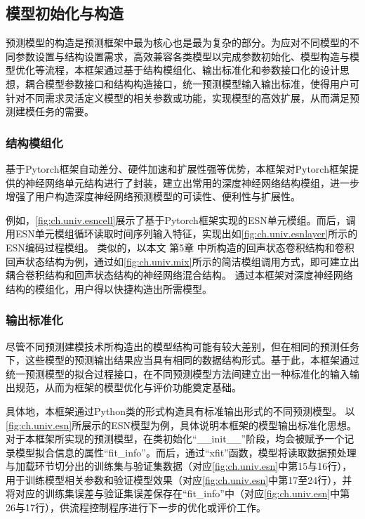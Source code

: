 \subsection{模型初始化与构造}
预测模型的构造是预测框架中最为核心也是最为复杂的部分。为应对不同模型的不同参数设置与结构设置需求，高效兼容各类模型以完成参数初始化、模型构造与模型优化等流程，本框架通过基于结构模组化、输出标准化和参数接口化的设计思想，耦合模型参数接口和结构构造接口，统一预测模型输入输出标准，使得用户可针对不同需求灵活定义模型的相关参数或功能，实现模型的高效扩展，从而满足预测建模任务的需要。


\subsubsection{结构模组化}
基于Pytorch框架自动差分、硬件加速和扩展性强等优势\cite{paszkePytorch2019}，本框架对Pytorch框架提供的神经网络单元结构进行了封装，建立出常用的深度神经网络结构模组，进一步增强了用户构造深度神经网络预测模型的可读性、便利性与扩展性。


例如，\autoref{fig:ch.univ.esncell}展示了基于Pytorch框架实现的ESN单元模组。而后，调用ESN单元模组循环读取时间序列输入特征，实现出如\autoref{fig:ch.univ.esnlayer}所示的ESN编码过程模组。
类似的，以本文
第5章
中所构造的回声状态卷积结构和卷积回声状态结构为例，通过如\autoref{fig:ch.univ.mix}所示的简洁模组调用方式，即可建立出耦合卷积结构和回声状态结构的神经网络混合结构。
通过本框架对深度神经网络结构的模组化，用户得以快捷构造出所需模型。

\subsubsection{输出标准化}
尽管不同预测建模技术所构造出的模型结构可能有较大差别，但在相同的预测任务下，这些模型的预测输出结果应当具有相同的数据结构形式。基于此，本框架通过统一预测模型的拟合过程接口，在不同预测模型方法间建立出一种标准化的输入输出规范，从而为框架的模型优化与评价功能奠定基础。

具体地，本框架通过Python类的形式构造具有标准输出形式的不同预测模型。
以\autoref{fig:ch.univ.esn}所展示的ESN模型为例，具体说明本框架的模型输出标准化思想。
对于本框架所实现的预测模型，在类初始化“__init__”阶段，均会被赋予一个记录模型拟合信息的属性“fit_info”。而后，通过“xfit”函数，模型将读取数据预处理与加载环节切分出的训练集与验证集数据（对应\autoref{fig:ch.univ.esn}中第15与16行），用于训练模型相关参数和验证模型效果（对应\autoref{fig:ch.univ.esn}中第17至24行），并将对应的训练集误差与验证集误差保存在“fit_info”中（对应\autoref{fig:ch.univ.esn}中第26与17行），供流程控制程序进行下一步的优化或评价工作。


